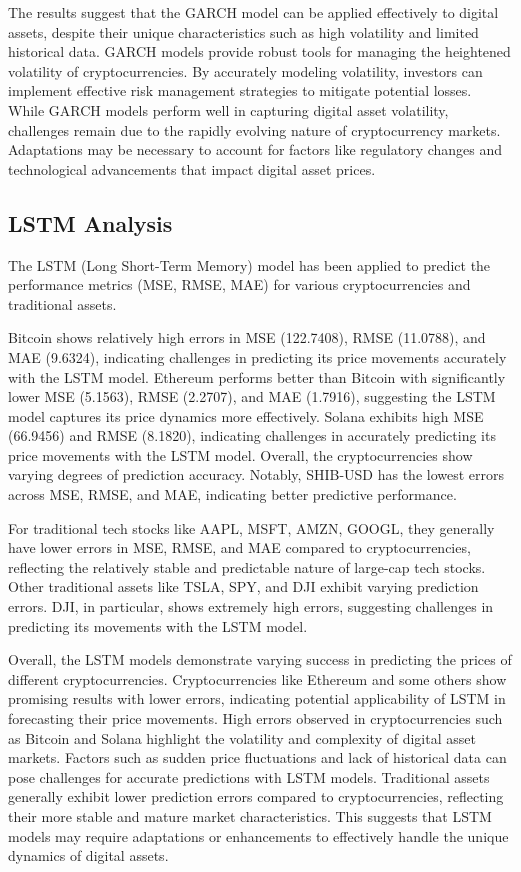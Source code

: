 The results suggest that the GARCH model can be applied effectively to digital assets, despite their unique characteristics such as high volatility and limited historical data. GARCH models provide robust tools for managing the heightened volatility of cryptocurrencies. By accurately modeling volatility, investors can implement effective risk management strategies to mitigate potential losses. While GARCH models perform well in capturing digital asset volatility, challenges remain due to the rapidly evolving nature of cryptocurrency markets. Adaptations may be necessary to account for factors like regulatory changes and technological advancements that impact digital asset prices.

\subsection{LSTM Analysis}

The LSTM (Long Short-Term Memory) model has been applied to predict the performance metrics (MSE, RMSE, MAE) for various cryptocurrencies and traditional assets.

Bitcoin shows relatively high errors in MSE (122.7408), RMSE (11.0788), and MAE (9.6324), indicating challenges in predicting its price movements accurately with the LSTM model. Ethereum performs better than Bitcoin with significantly lower MSE (5.1563), RMSE (2.2707), and MAE (1.7916), suggesting the LSTM model captures its price dynamics more effectively. Solana exhibits high MSE (66.9456) and RMSE (8.1820), indicating challenges in accurately predicting its price movements with the LSTM model. Overall, the cryptocurrencies show varying degrees of prediction accuracy. Notably, SHIB-USD has the lowest errors across MSE, RMSE, and MAE, indicating better predictive performance.

For traditional tech stocks like AAPL, MSFT, AMZN, GOOGL, they generally have lower errors in MSE, RMSE, and MAE compared to cryptocurrencies, reflecting the relatively stable and predictable nature of large-cap tech stocks. Other traditional assets like TSLA, SPY, and DJI exhibit varying prediction errors. DJI, in particular, shows extremely high errors, suggesting challenges in predicting its movements with the LSTM model.


Overall, the LSTM models demonstrate varying success in predicting the prices of different cryptocurrencies. Cryptocurrencies like Ethereum and some others show promising results with lower errors, indicating potential applicability of LSTM in forecasting their price movements. High errors observed in cryptocurrencies such as Bitcoin and Solana highlight the volatility and complexity of digital asset markets. Factors such as sudden price fluctuations and lack of historical data can pose challenges for accurate predictions with LSTM models. Traditional assets generally exhibit lower prediction errors compared to cryptocurrencies, reflecting their more stable and mature market characteristics. This suggests that LSTM models may require adaptations or enhancements to effectively handle the unique dynamics of digital assets.

